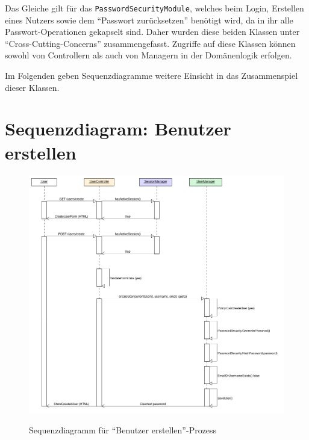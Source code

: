 \documentclass[12pt,DIV14,BCOR10mm,a4paper,parskip=half-,headsepline,headinclude,english,ngerman,bibliography=totocnumbered]{scrreprt}
\begin{document}
Das Gleiche gilt für das \texttt{PasswordSecurityModule}, welches beim Login, Erstellen eines Nutzers sowie dem \enquote{Passwort zurücksetzen} benötigt wird, da in ihr alle Passwort-Operationen gekapselt sind.
Daher wurden diese beiden Klassen unter \enquote{Cross-Cutting-Concerns} zusammengefasst.
Zugriffe auf diese Klassen können sowohl von Controllern als auch von Managern in der Domänenlogik erfolgen. \par
Im Folgenden geben Sequenzdiagramme weitere Einsicht in das Zusammenspiel dieser Klassen.

\section{Sequenzdiagram: Benutzer erstellen}

\begin{figure}[H]
\hspace*{-1cm}
\includegraphics[width=0.83\paperwidth]{resources/createuserseq_diagram.png}
\label{architecture:createuserseq_diagram}
\caption{Sequenzdiagramm für \enquote{Benutzer erstellen}-Prozess}
\end{figure}
\end{document}
